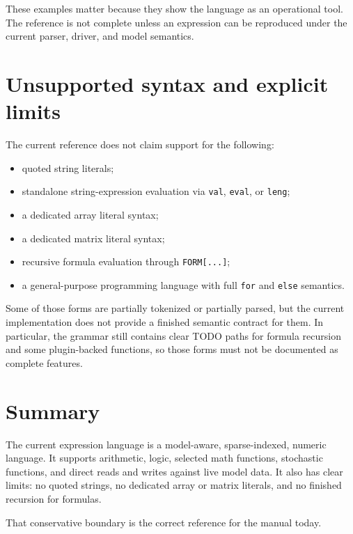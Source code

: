 These examples matter because they show the language as an operational tool.
The reference is not complete unless an expression can be reproduced under the
current parser, driver, and model semantics.

\section{Unsupported syntax and explicit limits}
\label{sec:expression-reference-unsupported}

The current reference does not claim support for the following:
\begin{itemize}
\item quoted string literals;
\item standalone string-expression evaluation via \texttt{val},
      \texttt{eval}, or \texttt{leng};
\item a dedicated array literal syntax;
\item a dedicated matrix literal syntax;
\item recursive formula evaluation through \texttt{FORM[...]};
\item a general-purpose programming language with full \texttt{for} and
      \texttt{else} semantics.
\end{itemize}

Some of those forms are partially tokenized or partially parsed, but the
current implementation does not provide a finished semantic contract for
them. In particular, the grammar still contains clear TODO paths for
formula recursion and some plugin-backed functions, so those
forms must not be documented as complete features.

\section{Summary}
\label{sec:expression-reference-summary}

The current expression language is a model-aware, sparse-indexed, numeric
language. It supports arithmetic, logic, selected math functions, stochastic
functions, and direct reads and writes against live model data. It also has
clear limits: no quoted strings, no dedicated array or matrix literals, and no
finished recursion for formulas.

That conservative boundary is the correct reference for the manual today.
